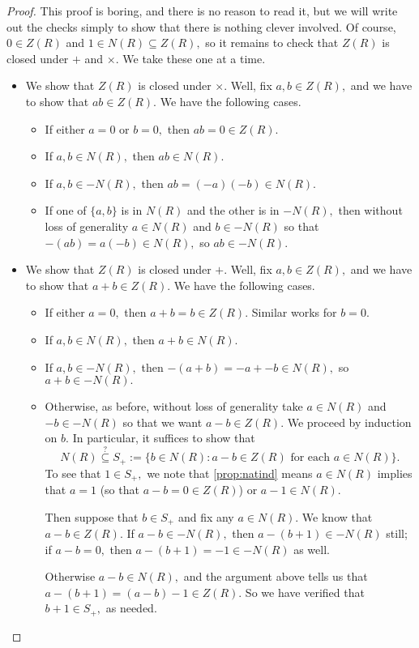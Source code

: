 \documentclass{article}
\begin{document}
\begin{proof}
	This proof is boring, and there is no reason to read it, but we will write out the checks simply to show that there is nothing clever involved. Of course, $0\in Z(R)$ and $1\in N(R)\subseteq Z(R),$ so it remains to check that $Z(R)$ is closed under $+$ and $\times.$ We take these one at a time.
	\begin{itemize}
		\item We show that $Z(R)$ is closed under $\times.$ Well, fix $a,b\in Z(R),$ and we have to show that $ab\in Z(R).$ We have the following cases.
		\begin{itemize}
			\item If either $a=0$ or $b=0,$ then $ab=0\in Z(R).$
			\item If $a,b\in N(R),$ then $ab\in N(R).$
			\item If $a,b\in-N(R),$ then $ab=(-a)(-b)\in N(R).$
			\item If one of $\{a,b\}$ is in $N(R)$ and the other is in $-N(R),$ then without loss of generality $a\in N(R)$ and $b\in-N(R)$ so that $-(ab)=a(-b)\in N(R),$ so $ab\in-N(R).$
		\end{itemize}
		\item We show that $Z(R)$ is closed under $+.$ Well, fix $a,b\in Z(R),$ and we have to show that $a+b\in Z(R).$ We have the following cases.
		\begin{itemize}
			\item If either $a=0,$ then $a+b=b\in Z(R).$ Similar works for $b=0.$
			\item If $a,b\in N(R),$ then $a+b\in N(R).$
			\item If $a,b\in-N(R),$ then $-(a+b)=-a+-b\in N(R),$ so $a+b\in-N(R).$
			\item Otherwise, as before, without loss of generality take $a\in N(R)$ and $-b\in-N(R)$ so that we want $a-b\in Z(R).$ We proceed by induction on $b.$ In particular, it suffices to show that
			\[N(R)\stackrel?\subseteq S_+:=\{b\in N(R):a-b\in Z(R)\text{ for each }a\in N(R)\}.\]
			To see that $1\in S_+,$ we note that \autoref{prop:natind} means $a\in N(R)$ implies that $a=1$ (so that $a-b=0\in Z(R)$) or $a-1\in N(R)$.

			Then suppose that $b\in S_+$ and fix any $a\in N(R).$ We know that $a-b\in Z(R).$ If $a-b\in-N(R),$ then $a-(b+1)\in-N(R)$ still; if $a-b=0,$ then $a-(b+1)=-1\in-N(R)$ as well.
			
			Otherwise $a-b\in N(R),$ and the argument above tells us that $a-(b+1)=(a-b)-1\in Z(R).$ So we have verified that $b+1\in S_+,$ as needed.
			\qedhere
		\end{itemize}
	\end{itemize}
\end{proof}
\end{document}
